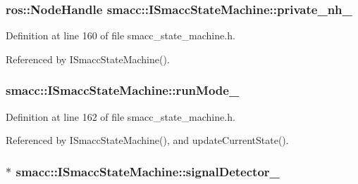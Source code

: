 \subsubsection[{\texorpdfstring{private\+\_\+nh\+\_\+}{private_nh_}}]{\setlength{\rightskip}{0pt plus 5cm}ros\+::\+Node\+Handle smacc\+::\+I\+Smacc\+State\+Machine\+::private\+\_\+nh\+\_\+\hspace{0.3cm}{\ttfamily [private]}}\hypertarget{classsmacc_1_1ISmaccStateMachine_a9c6a5c647ecca6599589c12fdcd53bfc}{}\label{classsmacc_1_1ISmaccStateMachine_a9c6a5c647ecca6599589c12fdcd53bfc}


Definition at line 160 of file smacc\+\_\+state\+\_\+machine.\+h.



Referenced by I\+Smacc\+State\+Machine().

\subsubsection[{\texorpdfstring{run\+Mode\+\_\+}{runMode_}}]{ smacc\+::\+I\+Smacc\+State\+Machine\+::run\+Mode\+\_\+\hspace{0.3cm}{\ttfamily [private]}}\hypertarget{classsmacc_1_1ISmaccStateMachine_a9f8cfbf577f7ae7a48b7a328e2e6b589}{}\label{classsmacc_1_1ISmaccStateMachine_a9f8cfbf577f7ae7a48b7a328e2e6b589}


Definition at line 162 of file smacc\+\_\+state\+\_\+machine.\+h.



Referenced by I\+Smacc\+State\+Machine(), and update\+Current\+State().

\subsubsection[{\texorpdfstring{signal\+Detector\+\_\+}{signalDetector_}}]{$\ast$ smacc\+::\+I\+Smacc\+State\+Machine\+::signal\+Detector\+\_\+\hspace{0.3cm}{\ttfamily [private]}}\hypertarget{classsmacc_1_1ISmaccStateMachine_a3982eb671f5f001cb047d3a467789986}{}\label{classsmacc_1_1ISmaccStateMachine_a3982eb671f5f001cb047d3a467789986}


